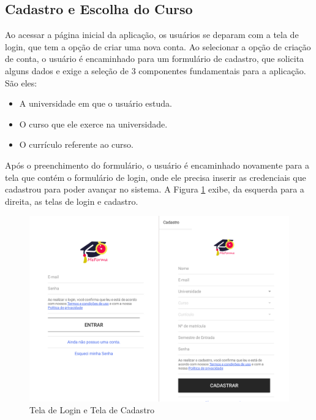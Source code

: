 \subsection{Cadastro e Escolha do Curso}
Ao acessar a página inicial da aplicação, os usuários se deparam com a tela de login, que tem a opção de criar uma nova conta. Ao selecionar a opção de criação de conta, o usuário é encaminhado para um formulário de cadastro, que solicita alguns dados e exige a seleção de 3 componentes fundamentais para a aplicação. São eles:
\begin{itemize}
\item A universidade em que o usuário estuda.
\item O curso que ele exerce na universidade.
\item O currículo referente ao curso.
\end{itemize}
Após o preenchimento do formulário, o usuário é encaminhado novamente para a tela que contém o formulário de login, onde ele precisa inserir as credenciais que cadastrou para poder avançar no sistema. A Figura \ref{login} exibe, da esquerda para a direita, as telas de login e cadastro.
\begin{figure}[H]
	   \centering
	   		\includegraphics[scale=0.25]{pics/c3/1-login.png}
	   \caption{Tela de Login e Tela de Cadastro}
	   \label{login}
\end{figure}


